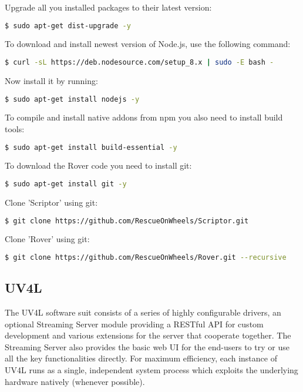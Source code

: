Upgrade all you installed packages to their latest version:
\begin{lstlisting}[language=bash]
  $ sudo apt-get dist-upgrade -y
\end{lstlisting}

To download and install newest version of Node.js, use the following command:
\begin{lstlisting}[language=bash]
  $ curl -sL https://deb.nodesource.com/setup_8.x | sudo -E bash -
\end{lstlisting}

Now install it by running: 
\begin{lstlisting}[language=bash]
  $ sudo apt-get install nodejs -y
\end{lstlisting}

To compile and install native addons from npm you also need to install build tools: 
\begin{lstlisting}[language=bash]
  $ sudo apt-get install build-essential -y
\end{lstlisting}

To download the Rover code you need to install git: 
\begin{lstlisting}[language=bash]
  $ sudo apt-get install git -y
\end{lstlisting}

Clone 'Scriptor' using git: 
\begin{lstlisting}[language=bash]
  $ git clone https://github.com/RescueOnWheels/Scriptor.git
\end{lstlisting}

Clone 'Rover' using git: 
\begin{lstlisting}[language=bash]
  $ git clone https://github.com/RescueOnWheels/Rover.git --recursive
\end{lstlisting}

\newpage
\subsection{UV4L}
The UV4L software suit consists of a series of highly configurable drivers, an optional Streaming Server module providing a RESTful API for custom development and various extensions for the server that cooperate together. The Streaming Server also provides the basic web UI for the end-users to try or use all the key functionalities directly. For maximum efficiency, each instance of UV4L runs as a single, independent system process which exploits the underlying hardware natively (whenever possible).

